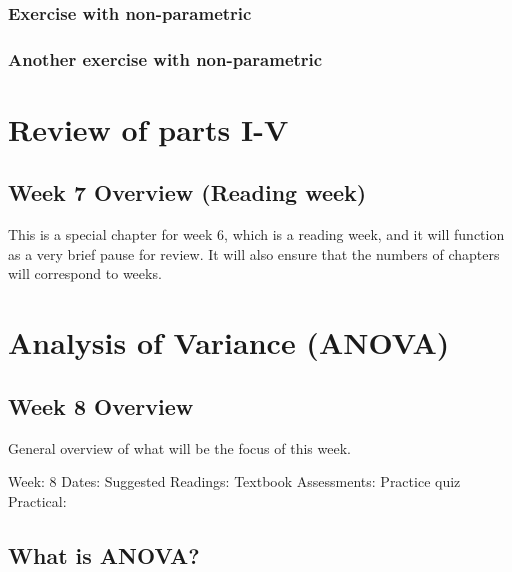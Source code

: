 \documentclass[
]{scrbook}
\begin{document}
\hypertarget{exercise-with-non-parametric}{%
\section{Exercise with non-parametric}\label{exercise-with-non-parametric}}

\hypertarget{another-exercise-with-non-parametric}{%
\section{Another exercise with non-parametric}\label{another-exercise-with-non-parametric}}

\hypertarget{part-review-of-parts-i-v}{%
\part{Review of parts I-V}\label{part-review-of-parts-i-v}}

\hypertarget{Week7}{%
\chapter*{Week 7 Overview (Reading week)}\label{Week7}}

This is a special chapter for week 6, which is a reading week, and it will function as a very brief pause for review. It will also ensure that the numbers of chapters will correspond to weeks.

\hypertarget{part-analysis-of-variance-anova}{%
\part{Analysis of Variance (ANOVA)}\label{part-analysis-of-variance-anova}}

\hypertarget{Week8}{%
\chapter*{Week 8 Overview}\label{Week8}}

General overview of what will be the focus of this week.

Week: 8
Dates:
Suggested Readings: Textbook
Assessments: Practice quiz
Practical:

\hypertarget{what-is-anova}{%
\chapter{What is ANOVA?}\label{what-is-anova}}
\end{document}
